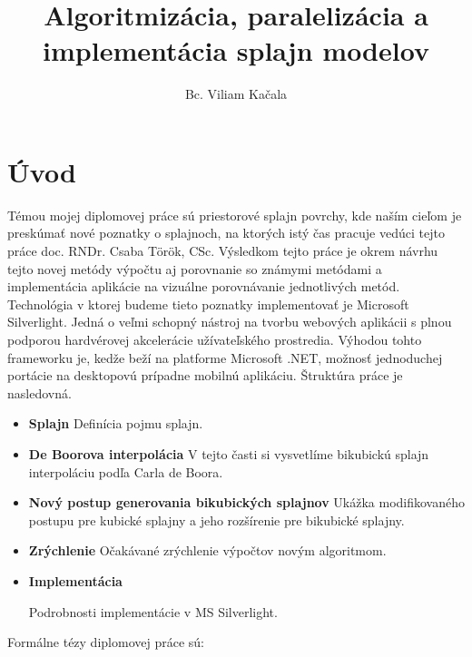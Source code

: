 \documentclass{rnthesis}
\title{Algoritmizácia, paralelizácia a implementácia splajn modelov}
\author{Bc. Viliam Kačala}
\begin{document}

\maketitle
\section*{Úvod}

Témou mojej diplomovej práce sú priestorové splajn povrchy, kde naším cieľom je preskúmať nové poznatky o splajnoch, na ktorých istý čas pracuje vedúci tejto práce doc. RNDr. Csaba Török, CSc.
Výsledkom tejto práce je okrem návrhu tejto novej metódy výpočtu aj porovnanie so známymi metódami a implementácia aplikácie na vizuálne porovnávanie jednotlivých metód.
Technológia v ktorej budeme tieto poznatky implementovať je Microsoft Silverlight. Jedná o veľmi schopný nástroj na tvorbu webových aplikácii s plnou podporou hardvérovej akcelerácie užívateľského prostredia.
Výhodou tohto frameworku je, kedže beží na platforme Microsoft .NET, možnosť jednoduchej portácie na desktopovú prípadne mobilnú aplikáciu. Štruktúra práce je nasledovná.
\begin{itemize}
\item{\textbf{Splajn}}
Definícia pojmu splajn.

\item{\textbf{De Boorova interpolácia}}
V tejto časti si vysvetlíme bikubickú splajn interpoláciu podľa Carla de Boora. 

\item{\textbf{Nový postup generovania bikubických splajnov}}
Ukážka modifikovaného postupu pre kubické splajny a jeho rozšírenie pre bikubické splajny.

\item{\textbf{Zrýchlenie}}
Očakávané zrýchlenie výpočtov novým algoritmom.


\item{\textbf{Implementácia}}

Podrobnosti implementácie v MS Silverlight.
\end{itemize}
Formálne tézy diplomovej práce sú:
\end{document}
